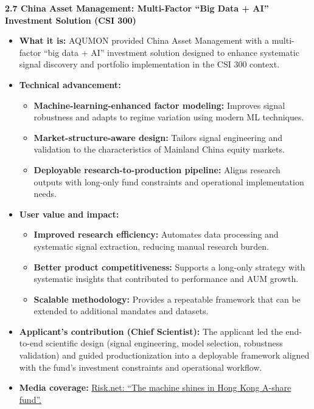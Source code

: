 \documentclass[11pt]{article}
\newcommand{\CVSubsection}[1]{\textbf{#1}\par}
\newenvironment{tightitemize}{%
  \begin{itemize}[leftmargin=*,nosep,topsep=2pt]
}{\end{itemize}}
\begin{document}
\CVSubsection{2.7 China Asset Management: Multi-Factor ``Big Data + AI'' Investment Solution (CSI 300)}

\begin{tightitemize}
  \item \textbf{What it is:} AQUMON provided China Asset Management with a multi-factor ``big data + AI'' investment solution designed to enhance systematic signal discovery and portfolio implementation in the CSI 300 context.
  \item \textbf{Technical advancement:}
  \begin{tightitemize}
    \item \textbf{Machine-learning-enhanced factor modeling:} Improves signal robustness and adapts to regime variation using modern ML techniques.
    \item \textbf{Market-structure-aware design:} Tailors signal engineering and validation to the characteristics of Mainland China equity markets.
    \item \textbf{Deployable research-to-production pipeline:} Aligns research outputs with long-only fund constraints and operational implementation needs.
  \end{tightitemize}
  \item \textbf{User value and impact:}
  \begin{tightitemize}
    \item \textbf{Improved research efficiency:} Automates data processing and systematic signal extraction, reducing manual research burden.
    \item \textbf{Better product competitiveness:} Supports a long-only strategy with systematic insights that contributed to performance and AUM growth.
    \item \textbf{Scalable methodology:} Provides a repeatable framework that can be extended to additional mandates and datasets.
  \end{tightitemize}
  \item \textbf{Applicant’s contribution (Chief Scientist):} The applicant led the end-to-end scientific design (signal engineering, model selection, robustness validation) and guided productionization into a deployable framework aligned with the fund’s investment constraints and operational workflow.
  \item \textbf{Media coverage:}
  \href{https://www.risk.net/asset-management/6168046/the-machine-shines-in-hong-kong-a-share-fund}{Risk.net: ``The machine shines in Hong Kong A-share fund''.}
\end{tightitemize}
\end{document}

